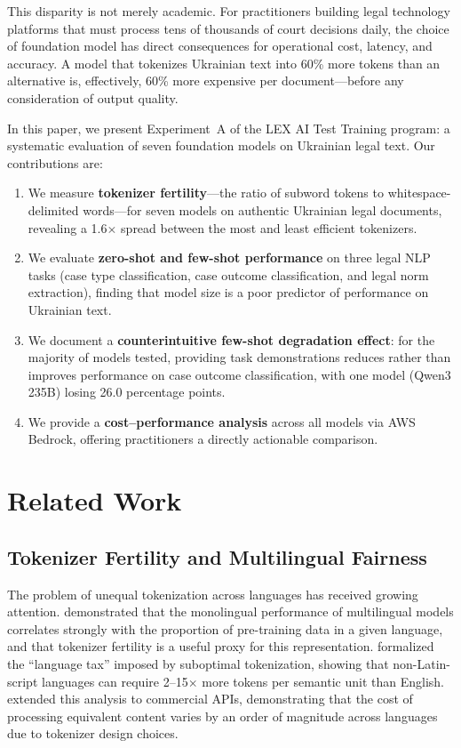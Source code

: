 \documentclass[11pt,a4paper]{article}
\begin{document}
This disparity is not merely academic. For practitioners building legal technology platforms that must process tens of thousands of court decisions daily, the choice of foundation model has direct consequences for operational cost, latency, and accuracy. A model that tokenizes Ukrainian text into 60\% more tokens than an alternative is, effectively, 60\% more expensive per document---before any consideration of output quality.

In this paper, we present Experiment~A of the LEX AI Test Training program: a systematic evaluation of seven foundation models on Ukrainian legal text. Our contributions are:

\begin{enumerate}[leftmargin=*]
    \item We measure \textbf{tokenizer fertility}---the ratio of subword tokens to whitespace-delimited words---for seven models on authentic Ukrainian legal documents, revealing a 1.6$\times$ spread between the most and least efficient tokenizers.
    \item We evaluate \textbf{zero-shot and few-shot performance} on three legal NLP tasks (case type classification, case outcome classification, and legal norm extraction), finding that model size is a poor predictor of performance on Ukrainian text.
    \item We document a \textbf{counterintuitive few-shot degradation effect}: for the majority of models tested, providing task demonstrations reduces rather than improves performance on case outcome classification, with one model (Qwen3 235B) losing 26.0 percentage points.
    \item We provide a \textbf{cost--performance analysis} across all models via AWS Bedrock, offering practitioners a directly actionable comparison.
\end{enumerate}

\section{Related Work}

\subsection{Tokenizer Fertility and Multilingual Fairness}

The problem of unequal tokenization across languages has received growing attention. \citet{rust2021good} demonstrated that the monolingual performance of multilingual models correlates strongly with the proportion of pre-training data in a given language, and that tokenizer fertility is a useful proxy for this representation. \citet{petrov2024language} formalized the ``language tax'' imposed by suboptimal tokenization, showing that non-Latin-script languages can require 2--15$\times$ more tokens per semantic unit than English. \citet{ahia2023all} extended this analysis to commercial APIs, demonstrating that the cost of processing equivalent content varies by an order of magnitude across languages due to tokenizer design choices.
\end{document}
